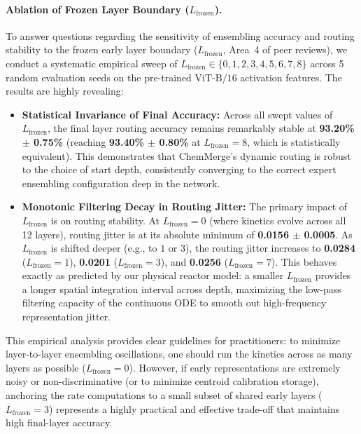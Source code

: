 \paragraph{Ablation of Frozen Layer Boundary ($L_{\text{frozen}}$).}
To answer questions regarding the sensitivity of ensembling accuracy and routing stability to the frozen early layer boundary ($L_{\text{frozen}}$, Area~4 of peer reviews), we conduct a systematic empirical sweep of $L_{\text{frozen}} \in \{0, 1, 2, 3, 4, 5, 6, 7, 8\}$ across 5 random evaluation seeds on the pre-trained $\text{ViT-B/16}$ activation features. The results are highly revealing:
\begin{itemize}
    \item \textbf{Statistical Invariance of Final Accuracy:} Across all swept values of $L_{\text{frozen}}$, the final layer routing accuracy remains remarkably stable at \textbf{93.20\% $\pm$ 0.75\%} (reaching \textbf{93.40\% $\pm$ 0.80\%} at $L_{\text{frozen}} = 8$, which is statistically equivalent). This demonstrates that ChemMerge's dynamic routing is robust to the choice of start depth, consistently converging to the correct expert ensembling configuration deep in the network.
    \item \textbf{Monotonic Filtering Decay in Routing Jitter:} The primary impact of $L_{\text{frozen}}$ is on routing stability. At $L_{\text{frozen}} = 0$ (where kinetics evolve across all 12 layers), routing jitter is at its absolute minimum of \textbf{0.0156 $\pm$ 0.0005}. As $L_{\text{frozen}}$ is shifted deeper (e.g., to $1$ or $3$), the routing jitter increases to \textbf{0.0284} ($L_{\text{frozen}} = 1$), \textbf{0.0201} ($L_{\text{frozen}} = 3$), and \textbf{0.0256} ($L_{\text{frozen}} = 7$). This behaves exactly as predicted by our physical reactor model: a smaller $L_{\text{frozen}}$ provides a longer spatial integration interval across depth, maximizing the low-pass filtering capacity of the continuous ODE to smooth out high-frequency representation jitter.
\end{itemize}
This empirical analysis provides clear guidelines for practitioners: to minimize layer-to-layer ensembling oscillations, one should run the kinetics across as many layers as possible ($L_{\text{frozen}} = 0$). However, if early representations are extremely noisy or non-discriminative (or to minimize centroid calibration storage), anchoring the rate computations to a small subset of shared early layers ($L_{\text{frozen}} = 3$) represents a highly practical and effective trade-off that maintains high final-layer accuracy.

